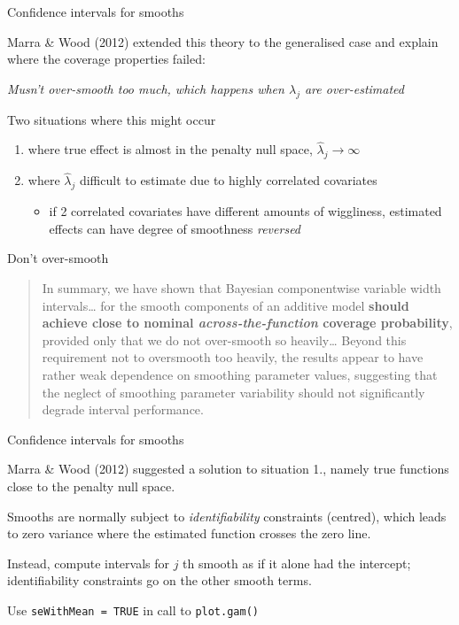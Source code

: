 \documentclass[10pt,ignorenonframetext,compress, aspectratio=169]{beamer}
\providecommand{\tightlist}{%
  \setlength{\itemsep}{0pt}\setlength{\parskip}{0pt}}
\begin{document}
\begin{frame}{Confidence intervals for smooths}

Marra \& Wood (2012) extended this theory to the generalised case and
explain where the coverage properties failed:

\emph{Musn't over-smooth too much, which happens when \(\lambda_j\) are
over-estimated}

Two situations where this might occur

\begin{enumerate}
\def\labelenumi{\arabic{enumi}.}
\tightlist
\item
  where true effect is almost in the penalty null space,
  \(\hat{\lambda}_j \rightarrow \infty\)
\item
  where \(\hat{\lambda}_j\) difficult to estimate due to highly
  correlated covariates

  \begin{itemize}
  \tightlist
  \item
    if 2 correlated covariates have different amounts of wiggliness,
    estimated effects can have degree of smoothness \emph{reversed}
  \end{itemize}
\end{enumerate}

\end{frame}

\begin{frame}{Don't over-smooth}

\begin{quote}
In summary, we have shown that Bayesian componentwise variable width
intervals\ldots{} for the smooth components of an additive model
\textbf{should achieve close to nominal \emph{across-the-function}
coverage probability}, provided only that we do not over-smooth so
heavily\ldots{} Beyond this requirement not to oversmooth too heavily,
the results appear to have rather weak dependence on smoothing parameter
values, suggesting that the neglect of smoothing parameter variability
should not significantly degrade interval performance.
\end{quote}

\end{frame}

\begin{frame}[fragile]{Confidence intervals for smooths}

Marra \& Wood (2012) suggested a solution to situation 1., namely true
functions close to the penalty null space.

Smooths are normally subject to \emph{identifiability} constraints
(centred), which leads to zero variance where the estimated function
crosses the zero line.

Instead, compute intervals for \(j\) th smooth as if it alone had the
intercept; identifiability constraints go on the other smooth terms.

Use \texttt{seWithMean\ =\ TRUE} in call to \texttt{plot.gam()}

\end{frame}
\end{document}
